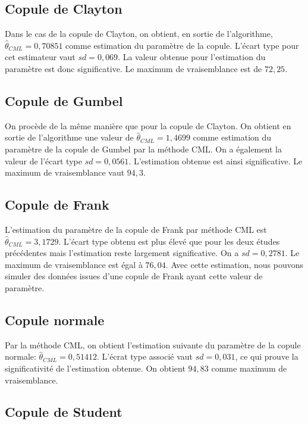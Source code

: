 \subsection{Copule de Clayton}

Dans le cas de la copule de Clayton, on obtient, en sortie de l'algorithme, $\widehat{\theta}_{CML}=0,70851$ comme estimation du paramètre de la copule. L'écart type pour cet estimateur vaut $sd = 0,069$. La valeur obtenue pour l'estimation du paramètre est donc significative. Le maximum de vraisemblance est de $72,25$. 

\subsection{Copule de Gumbel}

On procède de la même manière que pour la copule de Clayton. On obtient en sortie de l'algorithme une valeur de $\widehat{\theta}_{CML}=1,4699$ comme estimation du paramètre de la copule de Gumbel par la méthode CML. On a également la valeur de l'écart type $sd = 0,0561$. L'estimation obtenue est ainsi significative. Le maximum de vraisemblance vaut $94,3$.

\subsection{Copule de Frank}

L'estimation du paramètre de la copule de Frank par méthode CML est $\widehat{\theta}_{CML}=3,1729$. L'écart type obtenu est plus élevé que pour les deux études précédentes mais l'estimation reste largement significative. On a $sd = 0,2781$. Le maximum de vraisemblance est égal à $76,04$. Avec cette estimation, nous pouvons simuler des données issues d'une copule de Frank ayant cette valeur de paramètre. 

\subsection{Copule normale}

Par la méthode CML, on obtient l'estimation suivante du paramètre de la copule normale: $\widehat{\theta}_{CML}=0,51412$. L'écrat type associé vaut $sd = 0,031$, ce qui prouve la significativité de l'estimation obtenue. On obtient $94,83$ comme maximum de vraisemblance. 

\subsection{Copule de Student}

